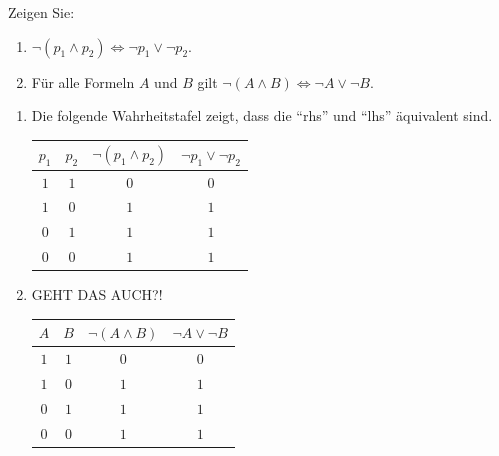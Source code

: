 
\begin{exercise}[18]

Zeigen Sie:

\begin{enumerate}[label = \alph*.]
    \item $\neg (p_1 \land p_2) \Leftrightarrow \neg p_1 \lor \neg p_2$.
    \item Für alle Formeln $A$ und $B$ gilt $\neg (A \land B) \Leftrightarrow \neg A \lor \neg B$.
\end{enumerate}

\end{exercise}


\begin{solution}

\phantom{}

\begin{enumerate}[label = \alph*]

    \item Die folgende Wahrheitstafel zeigt, dass die \enquote{rhs} und \enquote{lhs} äquivalent sind. \\

    \begin{tabular}{|c|c|c|c|}
        \hline
        $p_1$ & $p_2$ & $\neg (p_1 \land p_2)$ & $\neg p_1 \lor \neg p_2$ \\
        \hline
        $1$ & $1$ & $0$ & $0$ \\
        \hline
        $1$ & $0$ & $1$ & $1$ \\
        \hline
        $0$ & $1$ & $1$ & $1$ \\
        \hline
        $0$ & $0$ & $1$ & $1$ \\
        \hline
    \end{tabular}

    \item GEHT DAS AUCH?! \\

    \begin{tabular}{|c|c|c|c|}
        \hline
        $A$ & $B$ & $\neg (A \land B)$ & $\neg A \lor \neg B$ \\
        \hline
        $1$ & $1$ & $0$ & $0$ \\
        \hline
        $1$ & $0$ & $1$ & $1$ \\
        \hline
        $0$ & $1$ & $1$ & $1$ \\
        \hline
        $0$ & $0$ & $1$ & $1$ \\
        \hline
    \end{tabular}

\end{enumerate}

\end{solution}

